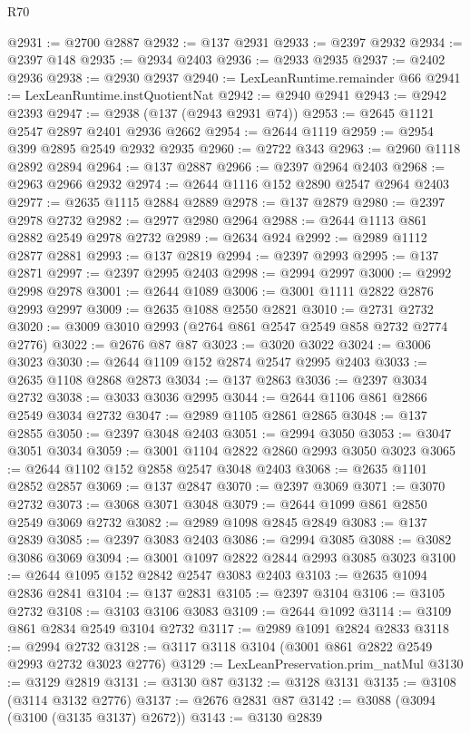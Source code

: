 \begin{lexlean}{R70}
\begin{coremodule}
@2931 := @2700 @2887
@2932 := @137 @2931
@2933 := @2397 @2932
@2934 := @2397 @148
@2935 := @2934 @2403
@2936 := @2933 @2935
@2937 := @2402 @2936
@2938 := @2930 @2937
@2940 := LexLeanRuntime.remainder @66
@2941 := LexLeanRuntime.instQuotientNat
@2942 := @2940 @2941
@2943 := @2942 @2393
@2947 := @2938 (@137 (@2943 @2931 @74))
@2953 := @2645 @1121 @2547 @2897 @2401 @2936 @2662
@2954 := @2644 @1119
@2959 := @2954 @399 @2895 @2549 @2932 @2935
@2960 := @2722 @343
@2963 := @2960 @1118 @2892 @2894
@2964 := @137 @2887
@2966 := @2397 @2964 @2403
@2968 := @2963 @2966 @2932
@2974 := @2644 @1116 @152 @2890 @2547 @2964 @2403
@2977 := @2635 @1115 @2884 @2889
@2978 := @137 @2879
@2980 := @2397 @2978 @2732
@2982 := @2977 @2980 @2964
@2988 := @2644 @1113 @861 @2882 @2549 @2978 @2732
@2989 := @2634 @924
@2992 := @2989 @1112 @2877 @2881
@2993 := @137 @2819
@2994 := @2397 @2993
@2995 := @137 @2871
@2997 := @2397 @2995 @2403
@2998 := @2994 @2997
@3000 := @2992 @2998 @2978
@3001 := @2644 @1089
@3006 := @3001 @1111 @2822 @2876 @2993 @2997
@3009 := @2635 @1088 @2550 @2821
@3010 := @2731 @2732
@3020 := @3009 @3010 @2993 (@2764 @861 @2547 @2549 @858 @2732 @2774 @2776)
@3022 := @2676 @87 @87
@3023 := @3020 @3022
@3024 := @3006 @3023
@3030 := @2644 @1109 @152 @2874 @2547 @2995 @2403
@3033 := @2635 @1108 @2868 @2873
@3034 := @137 @2863
@3036 := @2397 @3034 @2732
@3038 := @3033 @3036 @2995
@3044 := @2644 @1106 @861 @2866 @2549 @3034 @2732
@3047 := @2989 @1105 @2861 @2865
@3048 := @137 @2855
@3050 := @2397 @3048 @2403
@3051 := @2994 @3050
@3053 := @3047 @3051 @3034
@3059 := @3001 @1104 @2822 @2860 @2993 @3050 @3023
@3065 := @2644 @1102 @152 @2858 @2547 @3048 @2403
@3068 := @2635 @1101 @2852 @2857
@3069 := @137 @2847
@3070 := @2397 @3069
@3071 := @3070 @2732
@3073 := @3068 @3071 @3048
@3079 := @2644 @1099 @861 @2850 @2549 @3069 @2732
@3082 := @2989 @1098 @2845 @2849
@3083 := @137 @2839
@3085 := @2397 @3083 @2403
@3086 := @2994 @3085
@3088 := @3082 @3086 @3069
@3094 := @3001 @1097 @2822 @2844 @2993 @3085 @3023
@3100 := @2644 @1095 @152 @2842 @2547 @3083 @2403
@3103 := @2635 @1094 @2836 @2841
@3104 := @137 @2831
@3105 := @2397 @3104
@3106 := @3105 @2732
@3108 := @3103 @3106 @3083
@3109 := @2644 @1092
@3114 := @3109 @861 @2834 @2549 @3104 @2732
@3117 := @2989 @1091 @2824 @2833
@3118 := @2994 @2732
@3128 := @3117 @3118 @3104 (@3001 @861 @2822 @2549 @2993 @2732 @3023 @2776)
@3129 := LexLeanPreservation.prim_natMul
@3130 := @3129 @2819
@3131 := @3130 @87
@3132 := @3128 @3131
@3135 := @3108 (@3114 @3132 @2776)
@3137 := @2676 @2831 @87
@3142 := @3088 (@3094 (@3100 (@3135 @3137) @2672))
@3143 := @3130 @2839

\end{coremodule}
\end{lexlean}
